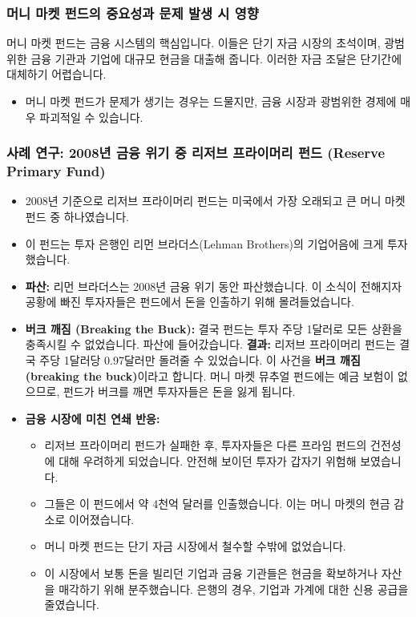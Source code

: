 \documentclass[11pt,a4paper]{article}
\theoremstyle{definition}
\begin{document}
\subsubsection*{머니 마켓 펀드의 중요성과 문제 발생 시 영향}
머니 마켓 펀드는 금융 시스템의 핵심입니다. 이들은 단기 자금 시장의 초석이며, 광범위한 금융 기관과 기업에 대규모 현금을 대출해 줍니다. 이러한 자금 조달은 단기간에 대체하기 어렵습니다.

\begin{itemize}
    \item 머니 마켓 펀드가 문제가 생기는 경우는 드물지만, 금융 시장과 광범위한 경제에 매우 파괴적일 수 있습니다.
\end{itemize}

\subsubsection*{사례 연구: 2008년 금융 위기 중 리저브 프라이머리 펀드 (Reserve Primary Fund)}
\begin{itemize}
    \item 2008년 기준으로 리저브 프라이머리 펀드는 미국에서 가장 오래되고 큰 머니 마켓 펀드 중 하나였습니다.
    \item 이 펀드는 투자 은행인 리먼 브라더스(Lehman Brothers)의 기업어음에 크게 투자했습니다.
    \item \textbf{파산:} 리먼 브라더스는 2008년 금융 위기 동안 파산했습니다. 이 소식이 전해지자 공황에 빠진 투자자들은 펀드에서 돈을 인출하기 위해 몰려들었습니다.
    \item \textbf{버크 깨짐 (Breaking the Buck):} 결국 펀드는 투자 주당 1달러로 모든 상환을 충족시킬 수 없었습니다. 파산에 들어갔습니다.
    \textbf{결과:} 리저브 프라이머리 펀드는 결국 주당 1달러당 0.97달러만 돌려줄 수 있었습니다. 이 사건을 \textbf{버크 깨짐 (breaking the buck)}이라고 합니다. 머니 마켓 뮤추얼 펀드에는 예금 보험이 없으므로, 펀드가 버크를 깨면 투자자들은 돈을 잃게 됩니다.
    \item \textbf{금융 시장에 미친 연쇄 반응:}
    \begin{itemize}
        \item 리저브 프라이머리 펀드가 실패한 후, 투자자들은 다른 프라임 펀드의 건전성에 대해 우려하게 되었습니다. 안전해 보이던 투자가 갑자기 위험해 보였습니다.
        \item 그들은 이 펀드에서 약 4천억 달러를 인출했습니다. 이는 머니 마켓의 현금 감소로 이어졌습니다.
        \item 머니 마켓 펀드는 단기 자금 시장에서 철수할 수밖에 없었습니다.
        \item 이 시장에서 보통 돈을 빌리던 기업과 금융 기관들은 현금을 확보하거나 자산을 매각하기 위해 분주했습니다. 은행의 경우, 기업과 가계에 대한 신용 공급을 줄였습니다.
    \end{itemize}
\end{itemize}
\end{document}
